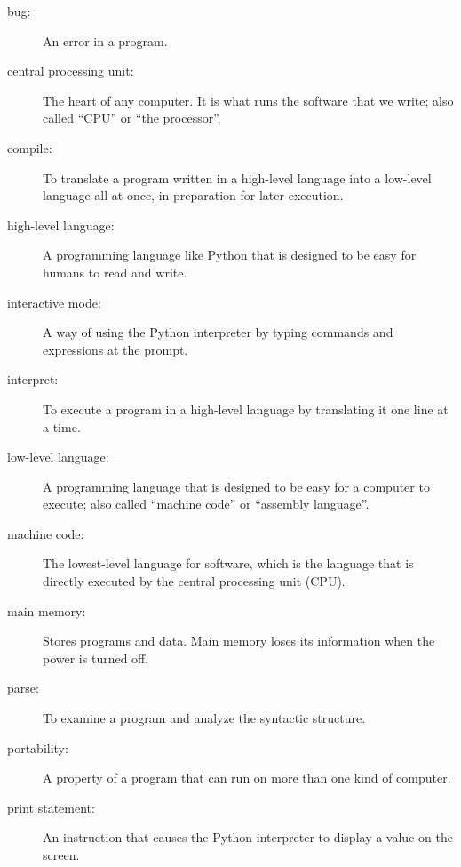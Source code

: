 \begin{description}

\item[bug:]  An error in a program.

\item[central processing unit:] The heart of any computer.  It is what
runs the software that we write; also called ``CPU'' or ``the processor''.

\item[compile:]  To translate a program written in a high-level language
into a low-level language all at once, in preparation for later
execution.

\item[high-level language:]  A programming language like Python that
is designed to be easy for humans to read and write.

\item[interactive mode:] A way of using the Python interpreter by
typing commands and expressions at the prompt.

\item[interpret:]  To execute a program in a high-level language
by translating it one line at a time.

\item[low-level language:]  A programming language that is designed
to be easy for a computer to execute; also called ``machine code'' or
``assembly language''.

\item[machine code:]  The lowest-level language for software, which 
is the language that is directly executed by the central processing unit 
(CPU).

\item[main memory:] Stores programs and data.  Main memory loses 
its information when the power is turned off.

\item[parse:]  To examine a program and analyze the syntactic structure.

\item[portability:]  A property of a program that can run on more
than one kind of computer.

\item[print statement:]  An instruction that causes the Python
interpreter to display a value on the screen.


\end{description}
